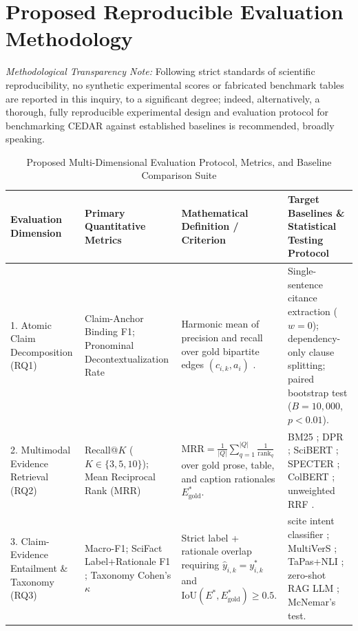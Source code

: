 \documentclass[journal]{IEEEtran}
\begin{document}
\section{Proposed Reproducible Evaluation Methodology}
\label{sec:evaluation}

\emph{Methodological Transparency Note:} Following strict standards of scientific reproducibility, no synthetic experimental scores or fabricated benchmark tables are reported in this inquiry, to a significant degree; indeed, alternatively, a thorough, fully reproducible experimental design and evaluation protocol for benchmarking CEDAR against established baselines is recommended, broadly speaking.

\begin{table}[t]
\centering
\footnotesize
\caption{Proposed Multi-Dimensional Evaluation Protocol, Metrics, and Baseline Comparison Suite}
\label{tab:evaluation_metrics}
\renewcommand{\arraystretch}{1.14}
\begin{tabularx}{\textwidth}{L{2.7cm} L{3.3cm} L{4.2cm} Y}
\toprule
\textbf{Evaluation Dimension} & \textbf{Primary Quantitative Metrics} & \textbf{Mathematical Definition / Criterion} & \textbf{Target Baselines \& Statistical Testing Protocol} \\
. Atomic Claim Decomposition (RQ1) & Claim-Anchor Binding F1; Pronominal Decontextualization Rate & Harmonic mean of precision and recall over gold bipartite edges $(c_{i,k}, a_i)$ \cite{kamoi2023wice,min2023factscore}. & Single-sentence citance extraction ($w=0$); dependency-only clause splitting; paired bootstrap test ($B=10{,}000$, $p < 0.01$). \\
2. Multimodal Evidence Retrieval (RQ2) & Recall@$K$ ($K \in \{3, 5, 10\}$); Mean Reciprocal Rank (MRR) & $\text{MRR} = \frac{1}{|Q|}\sum_{q=1}^{|Q|} \frac{1}{\text{rank}_q}$ over gold prose, table, and caption rationales $E_{\text{gold}}^*$. & BM25 \cite{robertson2009probabilistic}; DPR \cite{karpukhin2020dense}; SciBERT \cite{beltagy2019scibert}; SPECTER \cite{cohan2020specter}; ColBERT \cite{khattab2020colbert}; unweighted RRF \cite{cormack2009reciprocal}. \\
3. Claim-Evidence Entailment \& Taxonomy (RQ3) & Macro-F1; SciFact Label+Rationale F1 \cite{wadden2020fact}; Taxonomy Cohen's $\kappa$ & Strict label + rationale overlap requiring $\hat{y}_{i,k} = y^*_{i,k}$ and $\text{IoU}(E^*, E_{\text{gold}}^*) \geq 0.5$. & scite intent classifier \cite{nicholson2021scite}; MultiVerS \cite{wadden2022multivers}; TaPas+NLI \cite{herzig2020tapas,lu2023scitab}; zero-shot RAG LLM \cite{gao2023enabling}; McNemar's test. \\

\end{tabularx}
\end{table}
\end{document}
